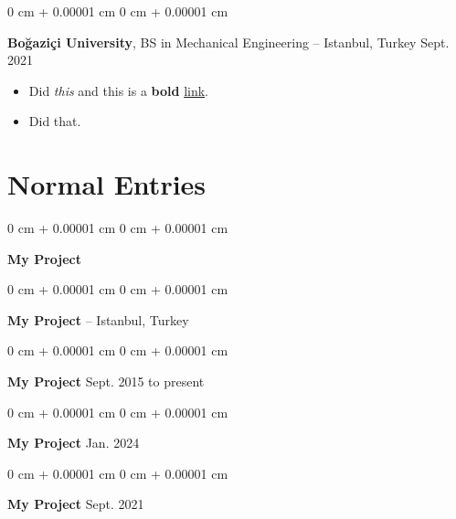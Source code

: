 \documentclass[10pt, letterpaper]{article}
\newenvironment{highlights}{
    \begin{itemize}[
        topsep=0.10 cm,
        parsep=0.10 cm,
        partopsep=0pt,
        itemsep=0pt,
        leftmargin=0 cm + 10pt
    ]
}{
    \end{itemize}
        
    \vspace{-0.20cm}
} %
\newenvironment{onecolentry}{
    \begin{adjustwidth}{
        0 cm + 0.00001 cm
    }{
        0 cm + 0.00001 cm
    }
}{
    \end{adjustwidth}
} %
\begin{document}
        \vspace{0.1 cm}

        \begin{onecolentry}
            \textbf{Boğaziçi University}, BS in Mechanical Engineering -- Istanbul, Turkey \hfill Sept. 2021
            \begin{highlights}
                \item Did \textit{this} and this is a \textbf{bold} \href{https://example.com}{link}.
                \item Did that.
            \end{highlights}
        \end{onecolentry}


    
    \section{Normal Entries}

        
        \begin{onecolentry}
            \textbf{My Project} \hfill 
        \end{onecolentry}

        \vspace{0.1 cm}

        \begin{onecolentry}
            \textbf{My Project} -- Istanbul, Turkey \hfill 
        \end{onecolentry}

        \vspace{0.1 cm}

        \begin{onecolentry}
            \textbf{My Project} \hfill Sept. 2015 to present
        \end{onecolentry}

        \vspace{0.1 cm}

        \begin{onecolentry}
            \textbf{My Project} \hfill Jan. 2024
        \end{onecolentry}

        \vspace{0.1 cm}

        \begin{onecolentry}
            \textbf{My Project} \hfill Sept. 2021
        \end{onecolentry}

        \vspace{0.1 cm}
\end{document}
